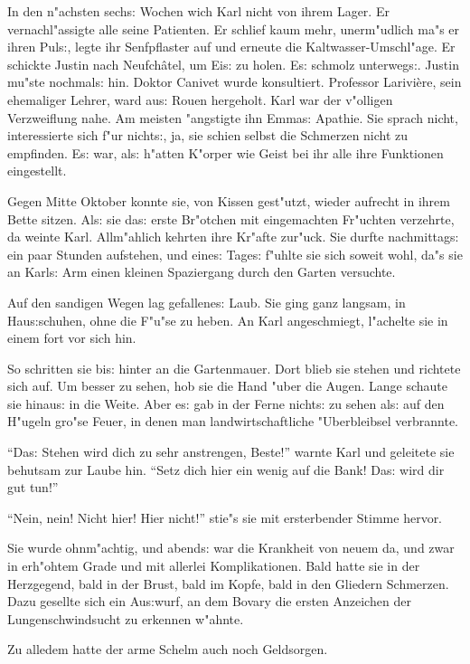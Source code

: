 \documentclass[oneside,12pt]{book}
\newcommand{\s}{s:}%
\begin{document}
In den n"achsten sech{\s} Wochen wich Karl nicht von ihrem Lager.
Er vernachl"assigte alle seine Patienten. Er schlief kaum mehr,
unerm"udlich ma"s er ihren Pul{\s}, legte ihr Senfpflaster auf und
erneute die Kaltwasser-Umschl"age. Er schickte Justin nach
Neufch\^atel, um Ei{\s} zu holen. E{\s} schmolz unterweg{\s}.
Justin mu"ste nochmal{\s} hin. Doktor Canivet wurde konsultiert.
Professor Larivi\`ere, sein ehemaliger Lehrer, ward au{\s} Rouen
hergeholt. Karl war der v"olligen Verzweiflung nahe. Am meisten
"angstigte ihn Emma{\s} Apathie. Sie sprach nicht, interessierte
sich f"ur nicht{\s}, ja, sie schien selbst die Schmerzen nicht zu
empfinden. E{\s} war, al{\s} h"atten K"orper wie Geist bei ihr
alle ihre Funktionen eingestellt.

Gegen Mitte Oktober konnte sie, von Kissen gest"utzt, wieder
aufrecht in ihrem Bette sitzen. Al{\s} sie da{\s} erste Br"otchen
mit eingemachten Fr"uchten verzehrte, da weinte Karl. Allm"ahlich
kehrten ihre Kr"afte zur"uck. Sie durfte nachmittag{\s} ein paar
Stunden aufstehen, und eine{\s} Tage{\s} f"uhlte sie sich soweit
wohl, da"s sie an Karl{\s} Arm einen kleinen Spaziergang durch den
Garten versuchte.

Auf den sandigen Wegen lag gefallene{\s} Laub. Sie ging ganz
langsam, in Hau{\s}schuhen, ohne die F"u"se zu heben. An Karl
angeschmiegt, l"achelte sie in einem fort vor sich hin.

So schritten sie bi{\s} hinter an die Gartenmauer. Dort blieb sie
stehen und richtete sich auf. Um besser zu sehen, hob sie die Hand
"uber die Augen. Lange schaute sie hinau{\s} in die Weite. Aber
e{\s} gab in der Ferne nicht{\s} zu sehen al{\s} auf den H"ugeln
gro"se Feuer, in denen man landwirtschaftliche "Uberbleibsel
verbrannte.

"`Da{\s} Stehen wird dich zu sehr anstrengen, Beste!"' warnte Karl
und geleitete sie behutsam zur Laube hin. "`Setz dich hier ein
wenig auf die Bank! Da{\s} wird dir gut tun!"'

"`Nein, nein! Nicht hier! Hier nicht!"' stie"s sie mit
ersterbender Stimme hervor.

Sie wurde ohnm"achtig, und abend{\s} war die Krankheit von neuem
da, und zwar in erh"ohtem Grade und mit allerlei Komplikationen.
Bald hatte sie in der Herzgegend, bald in der Brust, bald im
Kopfe, bald in den Gliedern Schmerzen. Dazu gesellte sich ein
Au{\s}wurf, an dem Bovary die ersten Anzeichen der
Lungenschwindsucht zu erkennen w"ahnte.

Zu alledem hatte der arme Schelm auch noch Geldsorgen.
\end{document}
